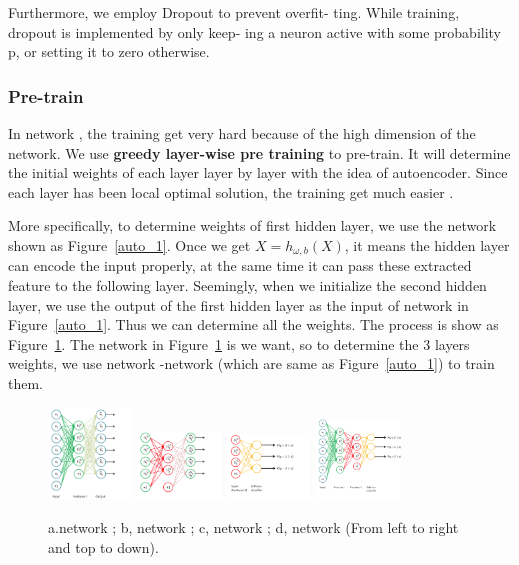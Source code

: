 \documentclass[sigconf]{acmart}
\begin{document}
Furthermore, we employ Dropout \cite{Dropout} to prevent overfit- ting. While training, dropout is implemented by only keep- ing a neuron active with some probability p, or setting it to zero otherwise.

\subsubsection{Pre-train}
In network , the training get very hard because of the high dimension of the network. We use \textbf{greedy layer-wise pre training} to pre-train. It will determine the initial weights of each layer layer by layer with the idea of autoencoder. Since each layer has been local optimal solution, the training get much easier .

More specifically, to determine weights of first hidden layer, we use the network shown as Figure~\ref{auto_1}. Once we get $X=h_{\omega,b}(X)$, it means the hidden layer can encode the input properly, at the same time it can pass these extracted feature to the following layer. Seemingly, when we initialize the second hidden layer, we use the output of the first hidden layer as the input of network in Figure~\ref{auto_1}. Thus we can determine all the weights. The process is show as Figure~\ref{pretrain_1}. The network   in  Figure~\ref{pretrain_1} is we want, so to determine the 3 layers weights, we use network -network  (which are same as  Figure~\ref{auto_1}) to train them.

\begin{figure}[]
	\centering
	\includegraphics[width=0.2\textwidth]{../figs/pretrain1.png}
	\includegraphics[width=0.2\textwidth]{../figs/pretrain2.png}
	\includegraphics[width=0.2\textwidth]{../figs/pretrain3.png}
	\includegraphics[width=0.2\textwidth]{../figs/pretrain4.png}
	\caption{a.network ;  b, network ; c, network ; d, network  (From left to right and top to down). }
	\label{pretrain_1}
	\centering
\end{figure}
\end{document}
